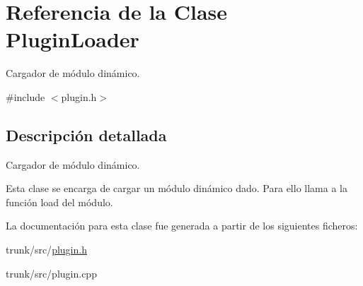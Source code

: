 \hypertarget{classPluginLoader}{\section{Referencia de la Clase Plugin\-Loader}
\label{classPluginLoader}
}


Cargador de módulo dinámico.  




{\ttfamily \#include $<$plugin.\-h$>$}



\subsection{Descripción detallada}
Cargador de módulo dinámico. 

Esta clase se encarga de cargar un módulo dinámico dado. Para ello llama a la función load del módulo. 

La documentación para esta clase fue generada a partir de los siguientes ficheros\-:\begin{DoxyCompactItemize}
\item 
trunk/src/\hyperlink{plugin_8h}{plugin.\-h}\item 
trunk/src/plugin.\-cpp\end{DoxyCompactItemize}
